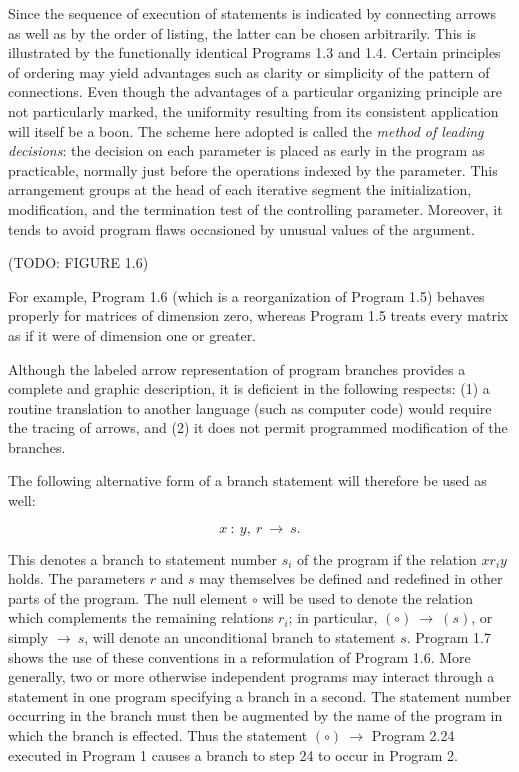 \par Since the sequence of execution of statements is indicated by connecting arrows as well as by the order of listing, the latter can be chosen arbitrarily. This is illustrated by the functionally identical Programs 1.3 and 1.4. Certain principles of ordering may yield advantages such as clarity or simplicity of the pattern of connections. Even though the advantages of a particular organizing principle are not particularly marked, the uniformity resulting from its consistent application will itself be a boon. The scheme here adopted is called the \textit{method of leading decisions}: the decision on each parameter is placed as early in the program as practicable, normally just before the operations indexed by the parameter. This arrangement groups at the head of each iterative segment the initialization, modification, and the termination test of the controlling parameter. Moreover, it tends to avoid program flaws occasioned by unusual values of the argument.

\par (TODO: FIGURE 1.6)

\par For example, Program 1.6 (which is a reorganization of Program 1.5) behaves properly for matrices of dimension zero, whereas Program 1.5 treats every matrix as if it were of dimension one or greater.

\par Although the labeled arrow representation of program branches provides a complete and graphic description, it is deficient in the following respects: (1) a routine translation to another language (such as computer code) would require the tracing of arrows, and (2) it does not permit programmed modification of the branches.

\par The following alternative form of a branch statement will therefore be used as well:

$$
x\ :\ y,\ r\ →\ s.
$$

\par This denotes a branch to statement number $s_i$ of the program if the relation $xr_i y$ holds. The parameters $r$ and $s$ may themselves be defined and redefined in other parts of the program. The null element $\circ$ will be used to denote the relation which complements the remaining relations $r_i$; in particular, $(\circ)\ →\ (s)$, or simply $→\ s$, will denote an unconditional branch to statement $s$. Program 1.7 shows the use of these conventions in a reformulation of Program 1.6. More generally, two or more otherwise independent programs may interact through a statement in one program specifying a branch in a second. The statement number occurring in the branch must then be augmented by the name of the program in which the branch is effected. Thus the statement $(\circ)\ →$ Program 2.24 executed in Program 1 causes a branch to step 24 to occur in Program 2.

